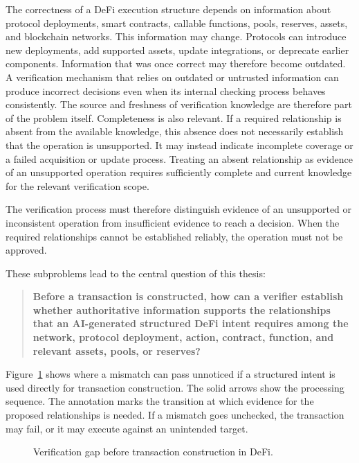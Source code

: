 The correctness of a DeFi execution structure depends on information
about protocol deployments, smart contracts, callable functions, pools,
reserves, assets, and blockchain networks. This information may change.
Protocols can introduce new deployments, add supported assets, update
integrations, or deprecate earlier components. Information that was
once correct may therefore become outdated. A verification mechanism that relies on outdated or untrusted
information can produce incorrect decisions even when its internal
checking process behaves consistently. The source and freshness of
verification knowledge are therefore part of the problem itself. Completeness is also relevant. If a required relationship is absent
from the available knowledge, this absence does not necessarily
establish that the operation is unsupported. It may instead indicate
incomplete coverage or a failed acquisition or update process.
Treating an absent relationship as evidence of an unsupported operation
requires sufficiently complete and current knowledge for the relevant
verification scope.

The verification process must therefore distinguish evidence of an
unsupported or inconsistent operation from insufficient evidence to
reach a decision. When the required relationships cannot be established
reliably, the operation must not be approved.


These subproblems lead to the central question of this thesis:

\begin{quote}
\textbf{Before a transaction is constructed, how can a verifier establish
whether authoritative information supports the relationships that an
AI-generated structured DeFi intent requires among the network, protocol
deployment, action, contract, function, and relevant assets, pools, or
reserves?}
\end{quote}

Figure~\ref{fig:problem_statement_overview} shows where a mismatch can
pass unnoticed if a structured intent is used directly for transaction
construction. The solid arrows show the processing sequence. The
annotation marks the transition at which evidence for the proposed
relationships is needed. If a mismatch goes unchecked, the transaction
may fail, or it may execute against an unintended target.

\begin{figure}[H]
    \centering
    
    \caption[Verification gap before transaction construction]{Verification gap before transaction construction in DeFi.}
    \label{fig:problem_statement_overview}
\end{figure}

